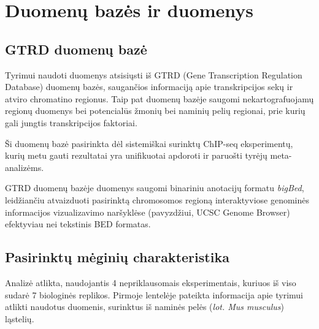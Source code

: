 \documentclass[12pt]{article}
\begin{document}
\newpage

\section{Duomenų bazės ir duomenys}
\subsection{GTRD duomenų bazė}
Tyrimui naudoti duomenys atsisiųsti iš GTRD (Gene Transcription Regulation
Database)\cite{GTRD} duomenų bazės, saugančios informaciją apie transkripcijos
sekų ir atviro chromatino regionus. Taip pat duomenų bazėje saugomi
nekartografuojamų regionų duomenys bei potencialūs žmonių bei naminių pelių
regionai, prie kurių gali jungtis transkripcijos faktoriai.

Ši duomenų bazė pasirinkta dėl sistemiškai surinktų ChIP-seq eksperimentų,
kurių metu gauti rezultatai yra unifikuotai apdoroti ir paruošti tyrėjų
meta-analizėms.

GTRD duomenų bazėje duomenys saugomi binariniu anotacijų formatu \emph{bigBed},
leidžiančiu atvaizduoti pasirinktą chromosomos regioną interaktyviose genominės
informacijos vizualizavimo naršyklėse (pavyzdžiui, UCSC Genome
Browser\cite{UCSCGB}) efektyviau nei tekstinis BED formatas.

\subsection{Pasirinktų mėginių charakteristika}
Analizė atlikta, naudojantis 4 nepriklausomais eksperimentais, kuriuos iš viso
sudarė 7 biologinės replikos. Pirmoje lentelėje pateikta informacija apie
tyrimui atlikti naudotus duomenis, surinktus iš naminės pelės (\emph{lot. Mus
musculus}) ląstelių.
\end{document}
